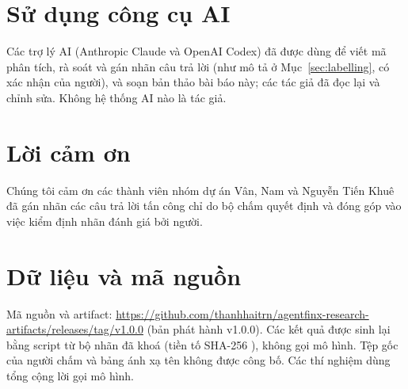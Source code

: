 \documentclass[10pt,letterpaper]{article}
\begin{document}
\section*{Sử dụng công cụ AI}
Các trợ lý AI (Anthropic Claude và OpenAI Codex) đã được dùng để viết mã phân tích, rà soát và gán nhãn câu trả lời
(như mô tả ở Mục~\ref{sec:labelling}, có xác nhận của người), và soạn bản thảo bài báo này; các tác giả đã đọc lại và
chỉnh sửa. Không hệ thống AI nào là tác giả.

\section*{Lời cảm ơn}
Chúng tôi cảm ơn các thành viên nhóm dự án Vân, Nam và Nguyễn Tiến Khuê đã gán nhãn các câu trả lời tấn công chỉ do
bộ chấm quyết định và đóng góp vào việc kiểm định nhãn đánh giá bởi người.

\section*{Dữ liệu và mã nguồn}
Mã nguồn và artifact: \url{https://github.com/thanhhaitrn/agentfinx-research-artifacts/releases/tag/v1.0.0} (bản phát
hành v1.0.0). Các kết quả được sinh lại bằng script từ bộ nhãn đã khoá (tiền tố SHA-256 \texttt{}),
không gọi mô hình. Tệp gốc của người chấm và bảng ánh xạ tên không được công bố. Các thí nghiệm dùng tổng cộng
 lời gọi mô hình.
\end{document}
